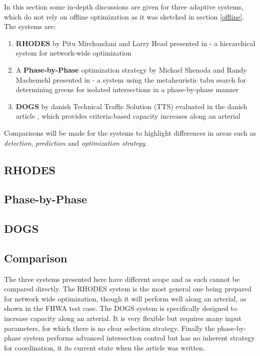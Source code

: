 In this section some in-depth discussions are given for three adaptive systems, which do not rely on offline optimization as it was sketched in section \ref{offline}. The systems are:

\begin{enumerate}
\item \textbf{RHODES} by Pitu Mirchandani and Larry Head presented in \cite{44} - a hierarchical system for network-wide optimization
\item A \textbf{Phase-by-Phase} optimization strategy by Michael Shenoda and Randy Machemehl presented in \cite{1} - a system using the metaheuristic tabu search for determining greens for isolated intersections in a phase-by-phase manner
\item \textbf{DOGS} by danish Technical Traffic Solution (TTS) evaluated in the danish article \cite{dogs}, which provides criteria-based capacity increases along an arterial
\end{enumerate}

Comparisons will be made for the systems to highlight differences in areas such as \textit{detection}, \textit{prediction} and \textit{optimization strategy}.

\subsection{RHODES}


\subsection{Phase-by-Phase}


\subsection{DOGS}


\subsection{Comparison}
The three systems presented here have different scope and as such cannot be compared directly. The RHODES system is the most general one being prepared for network wide optimization, though it will perform well along an arterial, as shown in the FHWA test case. The DOGS system is specifically designed to increase capacity along an arterial. It is very flexible but requires many input parameters, for which there is no clear selection strategy. Finally the phase-by-phase system performs advanced intersection control but has no inherent strategy for coordination, it its current state when the article was written.


